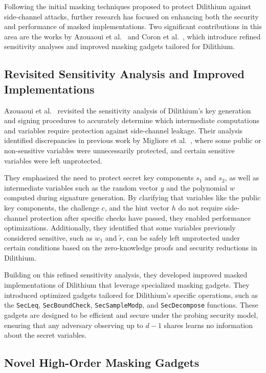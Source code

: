 Following the initial masking techniques proposed to protect Dilithium against side-channel attacks, further research has focused on enhancing both the security and performance of masked implementations. Two significant contributions in this area are the works by Azouaoui et al.~\cite{Azouaoui22} and Coron et al.~\cite{Coron23}, which introduce refined sensitivity analyses and improved masking gadgets tailored for Dilithium.

\subsection{Revisited Sensitivity Analysis and Improved Implementations}

Azouaoui et al.~\cite{Azouaoui22} revisited the sensitivity analysis of Dilithium's key generation and signing procedures to accurately determine which intermediate computations and variables require protection against side-channel leakage. Their analysis identified discrepancies in previous work by Migliore et al.~\cite{Migliore19}, where some public or non-sensitive variables were unnecessarily protected, and certain sensitive variables were left unprotected.

They emphasized the need to protect secret key components $s_1$ and $s_2$, as well as intermediate variables such as the random vector $y$ and the polynomial $w$ computed during signature generation. By clarifying that variables like the public key components, the challenge $c$, and the hint vector $h$ do not require side-channel protection after specific checks have passed, they enabled performance optimizations. Additionally, they identified that some variables previously considered sensitive, such as $w_1$ and $\tilde{r}$, can be safely left unprotected under certain conditions based on the zero-knowledge proofs and security reductions in Dilithium.

Building on this refined sensitivity analysis, they developed improved masked implementations of Dilithium that leverage specialized masking gadgets. They introduced optimized gadgets tailored for Dilithium's specific operations, such as the \texttt{SecLeq}, \texttt{SecBoundCheck}, \texttt{SecSampleModp}, and \texttt{SecDecompose} functions. These gadgets are designed to be efficient and secure under the probing security model, ensuring that any adversary observing up to $d-1$ shares learns no information about the secret variables.

\subsection{Novel High-Order Masking Gadgets}

